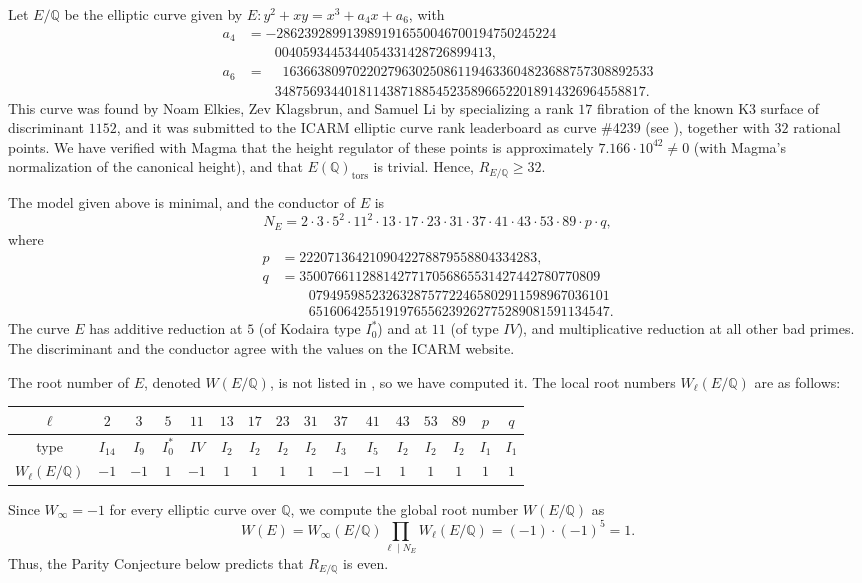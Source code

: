 \documentclass[11pt]{amsart}
\newcommand{\Q}{\mathbb Q}
\begin{document}
Let $E/\Q$ be the elliptic curve given by $E: y^2+xy=x^3+a_4x+a_6$, with
\begin{align*}
a_4&=-2862392899139891916550046700194750245224\\
&\qquad 0040593445344054331428726899413,\\
a_6&=\phantom{-}16366380970220279630250861194633604823688757308892533\\
&\qquad 34875693440181143871885452358966522018914326964558817.
\end{align*}
This curve was found by Noam Elkies, Zev Klagsbrun, and Samuel Li by specializing a rank $17$ fibration of the known K3 surface of discriminant $1152$, and it was submitted to the ICARM elliptic curve rank leaderboard as curve \#4239 (see \cite{icarm}), together with $32$ rational points. We have verified with Magma that the height regulator of these points is approximately $7.166\cdot 10^{42}\neq 0$ (with Magma's normalization of the canonical height), and that $E(\Q)_\text{tors}$ is trivial. Hence, $R_{E/\Q}\geq 32$.

The model given above is minimal, and the conductor of $E$ is
$$N_E=2\cdot 3\cdot 5^2\cdot 11^2\cdot 13\cdot 17\cdot 23\cdot 31\cdot 37\cdot 41\cdot 43\cdot 53\cdot 89\cdot p\cdot q,$$
where
\begin{align*}
p&=2220713642109042278879558804334283,\\
q&=3500766112881427717056865531427442780770809\\
&\qquad 0794959852326328757722465802911598967036101\\
&\qquad 6516064255191976556239262775289081591134547.
\end{align*}
The curve $E$ has additive reduction at $5$ (of Kodaira type $I_0^*$) and at $11$ (of type $IV$), and multiplicative reduction at all other bad primes. The discriminant and the conductor agree with the values on the ICARM website.

The root number of $E$, denoted $W(E/\Q)$, is not listed in \cite{icarm}, so we have computed it. The local root numbers $W_\ell(E/\Q)$ are as follows:
\begin{center}
\begin{tabular}{|c|ccccccccccccccc|}
\hline
$\ell$ & $2$ & $3$ & $5$ & $11$ & $13$ & $17$ & $23$ & $31$ & $37$ & $41$ & $43$ & $53$ & $89$ & $p$ & $q$\\ \hline
type & $I_{14}$ & $I_9$ & $I_0^*$ & $IV$ & $I_2$ & $I_2$ & $I_2$ & $I_2$ & $I_3$ & $I_5$ & $I_2$ & $I_2$ & $I_2$ & $I_1$ & $I_1$\\
\hline
$W_\ell(E/\Q)$ & $-1$ & $-1$ & $1$ & $-1$ & $1$ & $1$ & $1$ & $1$ & $-1$ & $-1$ & $1$ & $1$ & $1$ & $1$ & $1$\\
\hline
\end{tabular}
\end{center}
Since $W_\infty=-1$ for every elliptic curve over $\Q$, we compute the global root number $W(E/\Q)$ as
$$W(E)=W_\infty(E/\Q)\prod_{\ell\mid N_E}W_\ell(E/\Q)=(-1)\cdot(-1)^5=1.$$
Thus, the Parity Conjecture below predicts that $R_{E/\Q}$ is even.
\end{document}
